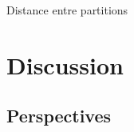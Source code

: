 \documentclass[11pt]{article}
\begin{document}
Distance entre partitions
\cite{porumbel2011efficient} \cite{day1981complexity} \cite{gusfield2002partition} \cite{rossi2011partition}


%







\section{Discussion}


\subsection{Perspectives}
\end{document}
